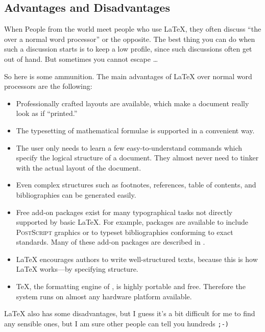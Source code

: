 \subsection{Advantages and Disadvantages}

When People from the  world meet people who use \LaTeX{},
they often discuss ``the  over a normal
word processor'' or the opposite.  The best thing you can do when such
a discussion starts is to keep a low profile, since such discussions
often get out of hand. But sometimes you cannot escape \ldots

\medskip\noindent So here is some ammunition. The main advantages
of \LaTeX{} over normal word processors are the following:

\begin{itemize}

\item Professionally crafted layouts are available, which make a
  document really look as if ``printed.''
\item The typesetting of mathematical formulae is supported in a
  convenient way.
\item The user only needs to learn a few easy-to-understand commands
  which specify the logical structure of a document. They almost never
  need to tinker with the actual layout of the document.
\item Even complex structures such as footnotes, references, table of
  contents, and bibliographies can be generated easily.
\item Free add-on packages exist for many typographical tasks not directly supported by basic
  \LaTeX. For example, packages are
  available to include \textsc{PostScript} graphics or to typeset
  bibliographies conforming to exact standards. Many of these add-on
  packages are described in \companion.
\item \LaTeX{} encourages authors to write well-structured texts,
  because this is how \LaTeX{} works---by specifying structure.
\item \TeX, the formatting engine of \LaTeXe, is highly portable and free.
  Therefore the system runs on almost any hardware platform
  available. 

%
%
\end{itemize}

\medskip

\noindent\LaTeX{} also has some disadvantages, but I guess it's a bit
difficult for me to find any sensible ones, but I am sure other people
can tell you hundreds \texttt{;-)}

